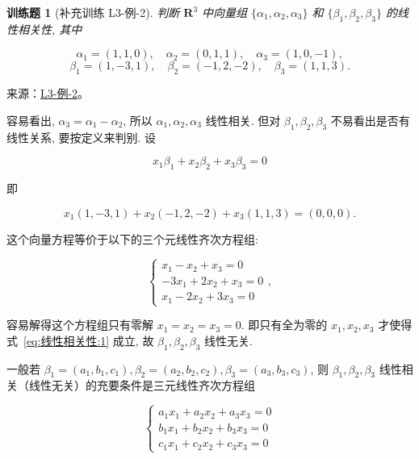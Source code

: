 \documentclass[12pt,fontset=fandol]{ctexart}
\newtheorem{exercise}{训练题}[section]
\begin{document}
\begin{exercise}[补充训练 L3-例-2]\label{prob:L3-例-2}
判断 $\mathbf{R}^3$ 中向量组 $\{\alpha_1, \alpha_2, \alpha_3\}$ 和 $\{\beta_1, \beta_2, \beta_3\}$ 的线性相关性, 其中

              \[
                  \alpha_1 = (1, 1, 0), \quad \alpha_2 = (0, 1, 1), \quad \alpha_3 = (1, 0, -1),
              \]
              \[
                  \beta_1 = (1, -3, 1), \quad \beta_2 = (-1, 2, -2), \quad \beta_3 = (1, 1, 3).
              \]
\end{exercise}
\noindent 来源：\href{https://github.com/yhwu-is/Linear-Algebra-Left-Undone/blob/new/%E8%AE%B2%E4%B9%89/%E4%B8%93%E9%A2%98/3%20%E6%9C%89%E9%99%90%E7%BB%B4%E7%BA%BF%E6%80%A7%E7%A9%BA%E9%97%B4.tex}{L3-例-2}。
\begin{solve}
容易看出, $\alpha_3 = \alpha_1 - \alpha_2$, 所以 $\alpha_1, \alpha_2, \alpha_3$ 线性相关. 但对 $\beta_1, \beta_2, \beta_3$ 不易看出是否有线性关系, 要按定义来判别. 设

              \begin{equation} \label{eq:线性相关性:1}
                  x_1 \beta_1 + x_2 \beta_2 + x_3 \beta_3 = 0
              \end{equation}

              即

              \[
                  x_1(1, -3, 1) + x_2(-1, 2, -2) + x_3(1, 1, 3) = (0, 0, 0).
              \]

              这个向量方程等价于以下的三个元线性齐次方程组:

              \[
                  \begin{cases}
                      x_1 - x_2 + x_3 = 0    \\
                      -3x_1 + 2x_2 + x_3 = 0 \\
                      x_1 - 2x_2 + 3x_3 = 0
                  \end{cases},
              \]

              容易解得这个方程组只有零解 $x_1 = x_2 = x_3 = 0$. 即只有全为零的 $x_1, x_2, x_3$ 才使得式~\eqref{eq:线性相关性:1} 成立, 故 $\beta_1, \beta_2, \beta_3$ 线性无关.

              一般若 $\beta_1 = (a_1, b_1, c_1), \beta_2 = (a_2, b_2, c_2), \beta_3 = (a_3, b_3, c_3)$, 则 $\beta_1, \beta_2, \beta_3$ 线性相关（线性无关）的充要条件是三元线性齐次方程组

              \[
                  \begin{cases}
                      a_1 x_1 + a_2 x_2 + a_3 x_3 = 0 \\
                      b_1 x_1 + b_2 x_2 + b_3 x_3 = 0 \\
                      c_1 x_1 + c_2 x_2 + c_3 x_3 = 0
                  \end{cases}
              \]


\end{solve}
\end{document}
